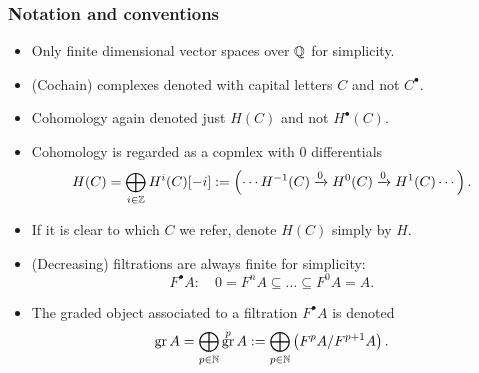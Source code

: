 \documentclass[notheorems, hyperref={backref}]{beamer}
\theoremstyle{plain}
\theoremstyle{definition}
\theoremstyle{darkredexample}
\theoremstyle{remark}
\DeclareMathOperator{\gr}{gr}
\begin{document}
\begin{frame}
    \frametitle{Notation and conventions \cite{stacks}}
	\begin{itemize}
	    \item Only finite dimensional vector spaces over $\mathbb{Q}$ for simplicity.
		\pause
	    \item (Cochain) complexes denoted with capital letters $C$ and not $C^{\bullet}$.
		\pause
	    \item Cohomology again denoted just $H(C)$ and not $H^{\bullet}(C)$.
		\pause
	    \item Cohomology is regarded as a copmlex with $0$ differentials
		\[ H(C)=\bigoplus_{i\in \mathbb{Z}}H^{i}(C)[-i]:=\left(\cdots H^{-1}(C)\xrightarrow{0} H^{0}(C)\xrightarrow{0}H^{1}(C) \cdots \right). \]
		\pause
	    \item If it is clear to which $C$ we refer, denote $H(C)$ simply by $H$.
		\pause
	    \item (Decreasing) filtrations are always finite for simplicity:
		\[ F^{\bullet}A \colon \quad 0=F^{n}A\subseteq \ldots \subseteq F^{0}A=A. \]
		\pause
	    \item The graded object associated to a filtration $F^{\bullet}A$ is denoted
		\[ \gr{A}=\bigoplus_{p\in \N} \gr^{p}A:=\bigoplus_{p\in \N}\left( F^{p}A/F^{p+1}A \right). \]
	\end{itemize}
\end{frame}
\end{document}
